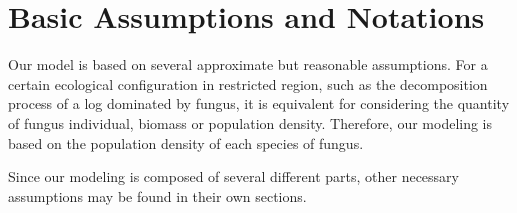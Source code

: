 \section{Basic Assumptions and Notations}\label{sec:assump}

Our model is based on several approximate but reasonable assumptions. For a certain ecological configuration in restricted region, such as the decomposition process of a log dominated by fungus, it is equivalent for considering the quantity of fungus individual, biomass or population density. Therefore, our modeling is based on the population density of each species of fungus.

Since our modeling is composed of several different parts, other necessary assumptions may be found in their own sections.






